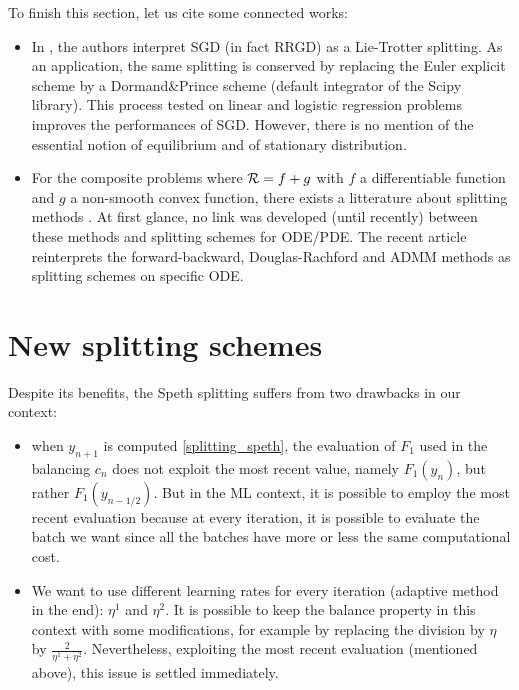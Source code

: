 \begin{remark}
	To finish this section, let us cite some connected works:
	\begin{itemize}
		\item In \cite{splitting_sgd}, the authors interpret SGD (in fact RRGD) as a Lie-Trotter splitting. As an application, the same splitting is conserved by replacing the Euler explicit scheme by a Dormand\&Prince scheme (default integrator of the Scipy library). This process tested on linear and logistic regression problems improves the performances of SGD. However, there is no mention of the essential notion of equilibrium and of stationary distribution. 
		\item For the composite problems where $\mathcal{R}=f+g$ with $f$ a differentiable function and $g$ a non-smooth convex function, there exists a litterature about splitting methods \cite{splitting_proximal}. At first glance, no link was developed (until recently) between these methods and splitting schemes for ODE/PDE. The recent article \cite{splitting_proximal_ode} reinterprets the forward-backward, Douglas-Rachford and ADMM methods as splitting schemes on specific ODE.   
	\end{itemize}
\end{remark}

\section{New splitting schemes}
\label{new_splitting}

Despite its benefits, the Speth splitting suffers from two drawbacks in our context:
\begin{itemize}
	\item when $y_{n+1}$ is computed \eqref{splitting_speth}, the evaluation of $F_1$ used in the balancing $c_n$ does not exploit the most recent value, namely $F_1(y_n)$, but rather $F_1(y_{n-1/2})$. But in the ML context, it is possible to employ the most recent evaluation because at every iteration, it is possible to evaluate the batch we want since all the batches have more or less the same computational cost. 
	\item We want to use different learning rates for every iteration (adaptive method in the end): $\eta^1$ and $\eta^2$. It is possible to keep the balance property in this context with some modifications, for example by replacing the division by $\eta$ by $\frac{2}{\eta^1+\eta^2}$. Nevertheless, exploiting the most recent evaluation (mentioned above), this issue is settled immediately. 
\end{itemize}

